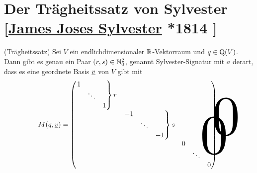 \documentclass[../../main.tex]{subfiles}
\begin{document}
\section[Der Trägheitssatz von Sylvester]{Der Trägheitssatz von Sylvester\\{\small[\href{https://de.wikipedia.org/wiki/James_Joseph_Sylvester}{James Joses Sylvester} *1814 ]}}

\begin{satdef}\label{14.1.1}
(Trägheitssatz) Sei $V$ ein endlichdimensionaler $\mathbb R$-Vektorraum und $q\in \operatorname{Q}(V)$. Dann gibt es genau ein Paar $(r,s)\in \mathbb N_0^2$, genannt Sylvester-Signatur mit $a$ derart, dass es eine geordnete Basis ${\underline v}$ von $V$ gibt mit
\begin{align*}
M(q,\underline{v})=\begin{pmatrix*}\begin{rcases}
\begin{matrix}1 & & \\& \ddots & \\& & 1\end{matrix}\end{rcases}r &  & \tikz[remember picture]\node[inner sep=0pt] (a) { };\\
 & \begin{rcases}\begin{matrix}-1 & & \\& \ddots & \\& & -1\end{matrix}\end{rcases}s & \\
\tikz[remember picture]\node[inner sep=0pt] (b) { }; &  & \begin{matrix}0 & & \\& \ddots & \\& & 0\end{matrix}\end{pmatrix*}.
\begin{tikzpicture}[overlay, remember picture]
\node at (a.north) [anchor=center,yshift=-0.5cm, xshift=-0.3cm, scale=8] {$0$};
\node at (b.south) [anchor=center,yshift=0.5cm, xshift=0.3cm, scale=8] {$0$};
\end{tikzpicture}
\end{align*}
\end{satdef}
\end{document}
